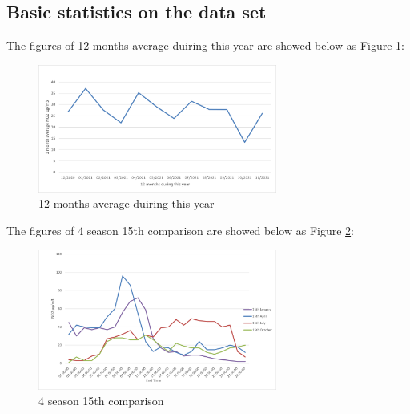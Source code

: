 \documentclass[a4paper,12pt,reqno]{article}
\begin{document}
\subsection*{Basic statistics on the data set}
    The figures of 12 months average duiring this year are showed below 
    as Figure \ref{fig:12_months_average_duiring_this_year}:
    \begin{figure}[H]
        \centering
        \includegraphics[width=0.7\textwidth]{figures/figure1.png}
        \caption{12 months average duiring this year}
        \label{fig:12_months_average_duiring_this_year}
    \end{figure}
    The figures of 4 season 15th comparison are showed below 
    as Figure \ref{fig:4_season_15th_comparison}:
    \begin{figure}[H]
        \centering
        \includegraphics[width=0.7\textwidth]{figures/figure2.png}
        \caption{4 season 15th comparison}
        \label{fig:4_season_15th_comparison}
    \end{figure}
\end{document}
